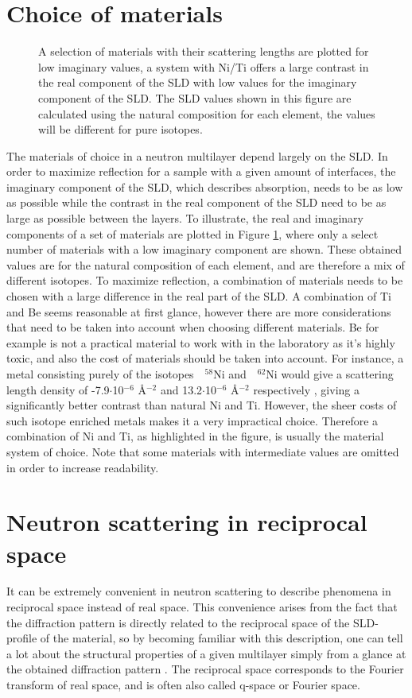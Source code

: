 \section{Choice of materials}
\begin{figure}
	\centering
	\def\svgwidth{\textwidth}
	
	\caption{A selection of materials with their scattering lengths are plotted for low imaginary values, a system with Ni/Ti offers a large contrast in the real component of the SLD with low values for the imaginary component of the SLD. The SLD values shown in this figure are calculated using the natural composition for each element, the values will be different for pure isotopes.}
	\label{SLDchoice}
\end{figure}
The materials of choice in a neutron multilayer depend largely on the SLD. In order to maximize reflection for a sample with a given amount of interfaces, the imaginary component of the SLD, which describes absorption, needs to be as low as possible while the contrast in the real component of the SLD need to be as large as possible between the layers. To illustrate, the real and imaginary components of a set of materials are plotted in Figure \ref{SLDchoice}, where only a select number of materials with a low imaginary component are shown. These obtained values are for the natural composition of each element, and are therefore a mix of different isotopes. To maximize reflection, a combination of materials needs to be chosen with a large difference in the real part of the SLD. A combination of Ti and Be seems reasonable at first glance, however there are more considerations that need to be taken into account when choosing different materials. Be for example is not a practical material to work with in the laboratory as it's highly toxic, and also the cost of materials should be taken into account. For instance, a metal consisting purely of the isotopes $\textrm{ }^{\textrm{58}}$Ni and $\textrm{ }^{\textrm{62}}$Ni would give a scattering length density of -7.9$\cdot$10$^{-\textrm{6}}$ Å$^{-\textrm{2}}$ and 13.2$\cdot$10$^{-\textrm{6}}$ Å$^{-\textrm{2}}$ respectively \cite{periodictable}, giving a significantly better contrast than natural Ni and Ti. However, the sheer costs of such isotope enriched metals makes it a very impractical choice. Therefore a combination of Ni and Ti, as highlighted in the figure, is usually the material system of choice. Note that some materials with intermediate values are omitted in order to increase readability.
\clearpage
\section{Neutron scattering in reciprocal space}\label{neutron_scattering_reciprocal}
It can be extremely convenient in neutron scattering to describe phenomena in reciprocal space instead of real space. This convenience arises from the fact that the diffraction pattern is directly related to the reciprocal space of the SLD-profile of the material, so by becoming familiar with this description, one can tell a lot about the structural properties of a given multilayer simply from a glance at the obtained diffraction pattern \cite{shinjo_takada_1987}. The reciprocal space corresponds to the Fourier transform of real space, and is often also called q-space or Fourier space. 
